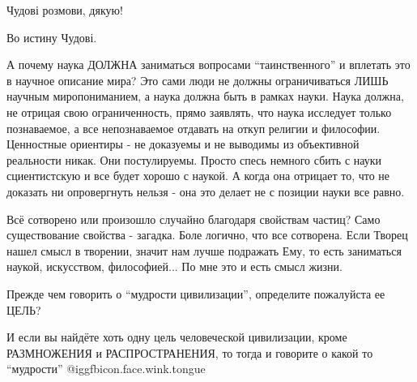 \begin{multicols}{2}
Чудові розмови, дякую!

Во истину Чудові.


А почему наука ДОЛЖНА заниматься вопросами \enquote{таинственного} и вплетать это в
научное описание мира? Это сами люди не должны ограничиваться ЛИШЬ научным
миропониманием, а наука должна быть в рамках науки. Наука должна, не отрицая
свою ограниченность, прямо заявлять, что наука исследует только познаваемое, а
все непознаваемое отдавать на откуп религии и философии. Ценностные ориентиры -
не доказуемы и не выводимы из объективной реальности никак. Они постулируемы.
Просто спесь немного сбить с науки сциентистскую и все будет хорошо с наукой. А
когда она отрицает то, что не доказать ни опровергнуть нельзя - она это делает
не с позиции науки все равно.


Всё сотворено или произошло случайно  благодаря свойствам частиц? Само
существование свойства - загадка.  Боле логично, что все сотворена.  Если Творец
нашел смысл в творении, значит нам лучше подражать Ему, то есть заниматься
наукой, искусством, философией... По мне это и есть смысл жизни.


Прежде чем говорить о \enquote{мудрости цивилизации}, определите пожалуйста ее
ЦЕЛЬ?

И если вы найдёте хоть одну цель человеческой цивилизации, кроме РАЗМНОЖЕНИЯ и
РАСПРОСТРАНЕНИЯ, то тогда и говорите о какой то \enquote{мудрости} @igg{fbicon.face.wink.tongue} 

\end{multicols} %
